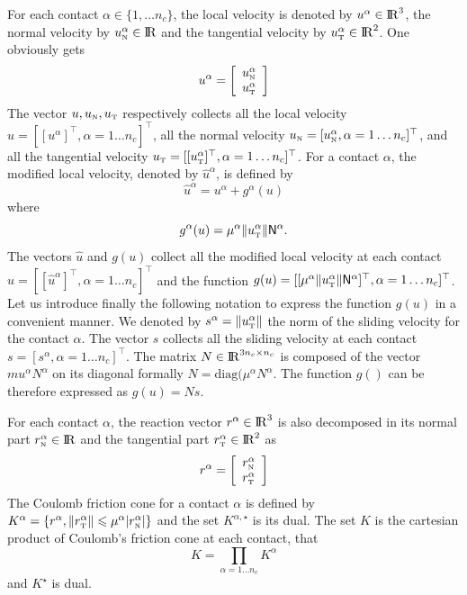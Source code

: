 For each contact $\alpha \in \{1,\ldots n_c\}$, the  local velocity  is denoted by $u^\alpha \in \mathrm{I\!R}^3$, the normal velocity by $u_{\hbox{\tiny{N}}}^{\alpha}\in \mathrm{I\!R}$ and the tangential velocity by $u_{\hbox{\tiny{T}}}^\alpha\in\mathrm{I\!R}^2$. One obviously 
gets
\begin{equation}
  \label{eq:contactvelocity}
  u^\alpha =\left[
  \begin{array}{c}
    u^\alpha_{\n} \\
    u^\alpha_{\t}   
  \end{array}\right]
\end{equation}
The vector $u, u_{\hbox{\tiny{N}}}, u_{\hbox{\tiny{T}}}$ respectively collects all the local velocity
$  u = [[u^\alpha]^\top, \alpha = 1\ldots n_c]^\top$,
all the normal velocity 
$
  u_{\hbox{\tiny{N}}} = [ u^\alpha_{{\hbox{\tiny{N}}}}, \alpha = 1\ldots n_c]^\top$,
and all the  tangential velocity
$
  u_{\hbox{\tiny{T}}} = [ [u^\alpha_{{\hbox{\tiny{T}}}}]^\top, \alpha = 1\ldots n_c]^\top$.
For a contact $\alpha $, the modified local velocity, denoted by $\hat u^\alpha $, is defined by
\begin{equation}
  \label{eq:modified}
  \hat u^\alpha = u^\alpha + g^\alpha(u)
\end{equation}
where
\begin{equation}
  \label{eq:modified-bis}
  g^\alpha(u) =  \mu^\alpha  \|u^\alpha_\t\| {\sf N}^\alpha.
\end{equation}
The vectors $\hat u$ and $g(u)$ collect all the modified local velocity at each contact $\hat u = [[\hat u^\alpha]^\top, \alpha = 1\ldots n_c]^\top$ and the function $g(u) = [[\mu^\alpha  \|u^\alpha_{\hbox{\tiny{T}}}\| {\sf N}^\alpha]^\top, \alpha = 1\ldots n_c]^\top$. Let us introduce finally the following notation to express the function $g(u)$ in a convenient manner. We denoted by $s^\alpha = \|u^\alpha_{\hbox{\tiny{T}}}\|$ the norm of the sliding velocity for the contact $\alpha$. The vector $s$ collects all the sliding velocity at each contact $s = [ s^\alpha, \alpha = 1\ldots n_c]^\top$. The matrix $ N \in \mathrm{I\!R}^{3n_c\times n_c}$ is composed of the vector $ mu^\alpha N^\alpha$ on its diagonal formally $N = \mbox{diag}(\mu^\alpha N^\alpha$. The function $g()$ can be therefore expressed as $g(u) = N s$.

For each contact $\alpha$, the reaction vector $r^\alpha\in \mathrm{I\!R}^3$ is also decomposed in its normal part $r_{\hbox{\tiny{N}}}^{\alpha}\in \mathrm{I\!R}$ and the tangential part $r_{\hbox{\tiny{T}}}^\alpha\in\mathrm{I\!R}^2$ as
\begin{equation}
  \label{eq:contactreaction}
  r^\alpha = \left[
  \begin{array}{c}
    r^\alpha_{\n} \\
    r^\alpha_{\t}   
  \end{array}\right]
\end{equation}
The Coulomb friction cone for a  contact $\alpha$ is defined by $K^{\alpha}  = \{r^\alpha, \|r^\alpha_{\hbox{\tiny{T}}} \| \leqslant \mu^\alpha |r^\alpha_{\hbox{\tiny{N}}}| \}$ and the set $K^{\alpha,\star}$ is its dual. 
The set $K$ is the cartesian product of Coulomb's friction cone at each contact, that 
\begin{equation}
  \label{eq:CC}
  K = \prod_{\alpha=1\ldots n_c} K^{\alpha} 
\end{equation}
and $K^\star$ is dual.

